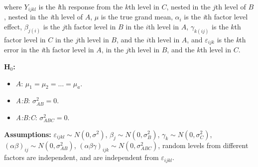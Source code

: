 \documentclass[12pt,english]{article}\usepackage[]{graphicx}\usepackage[table]{xcolor}
\begin{document}
\noindent where $Y_{ijkl}$ is the \textit{l}th response from the $k$th level in $C$, nested in the $j$th level of $B$, nested in the \textit{i}th level of $A$, $\mu$ is the true grand mean, $\alpha_i$ is the \textit{i}th factor level effect, $\beta_{j(i)}$ is the $j$th factor level in $B$ in the $i$th level in $A$, $\gamma_{k(ij)}$ is the $k$th factor level in $C$ in the $j$th level in $B$, and the $i$th level in $A$, and $\varepsilon_{ijk}$ is the \textit{k}th error in the \textit{i}th factor level in $A$, in the $j$th level in $B$, and the $k$th level in $C$. \\
\vspace{0.05in}

\noindent \textbf{H$_0$:}
\begin{itemize}
\item $A$: $\mu_1 = \mu_2 = \dots = \mu_a$.
\item \textit{A:B}: $\sigma^2_{AB} = 0$.
\item \textit{A:B:C}: $\sigma^2_{ABC} = 0$.
\end{itemize}
\vspace{0.1in}

\noindent \textbf{Assumptions:} $\varepsilon_{ijkl} \sim N(0, \sigma^2)$, \hspace{0.1in} $\beta_j \sim N(0, \sigma^2_B)$,\hspace{0.1in} $\gamma_k \sim N(0, \sigma^2_C)$, \hspace{0.1in}  $(\alpha\beta)_{ij} \sim N(0, \sigma^2_{AB})$, \hspace{0.1in} $(\alpha\beta\gamma)_{ijk} \sim N(0, \sigma^2_{ABC})$, \hspace{0.1in} random levels from different factors are independent, and are independent from $\varepsilon_{ijkl}$.
\vspace{0.1in}
\end{document}
